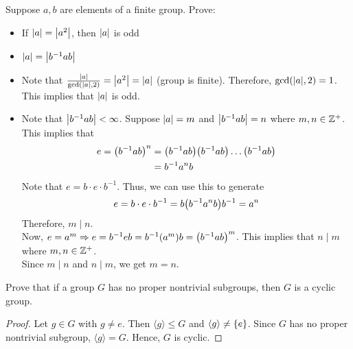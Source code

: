 \begin{exercise}
    Suppose $a, b$ are elements of a finite group. Prove:
    \begin{itemize}
        \item If $\qty|a| = \qty|a^2|$, then $\qty|a|$ is odd
        \item $\qty|a| = \qty|b^{-1}ab|$
    \end{itemize}
\end{exercise}

\begin{solution} \phantom{blank}
    \begin{itemize}
        \item Note that $\frac{\qty|a|}{\text{gcd}\qty(\qty|a|, 2)} = \qty|a^2| = \qty|a|$ (group is finite). Therefore, $\text{gcd}\qty(\qty|a|, 2) = 1$. This implies that $\qty|a|$ is odd.
        \item Note that $\qty|b^{-1}ab| < \infty$. Suppose $\qty|a| = m$ and $\qty|b^{-1}ab| = n$ where $m, n \in \mathbb{Z}^+$. This implies that
        \begin{align*}
            e = \qty(b^{-1}ab)^n &= \qty(b^{-1}ab)\qty(b^{-1}ab) \ldots \qty(b^{-1}ab) \\
            &= b^{-1}a^nb
        \end{align*}
        Note that $e = b \cdot e \cdot b^{-1}$. Thus, we can use this to generate
        \[ e = b \cdot e \cdot b^{-1} = b \qty(b^{-1} a^n b) b^{-1} = a^n \]
        Therefore, $m \mid n$. \\
        
        Now, $e = a^m \Rightarrow e = b^{-1}eb = b^{-1}\qty(a^m)b = \qty(b^{-1}ab)^m$. This implies that $n \mid m$ where $m, n \in \mathbb{Z}^+$. \\
        
        Since $m \mid n$ and $n \mid m$, we get $m = n$.
    \end{itemize}
\end{solution}

\begin{exercise}
    Prove that if a group $G$ has no proper nontrivial subgroups, then $G$ is a cyclic group.
\end{exercise}

\begin{proof}
    Let $g \in G$ with $g \neq e$. Then $\langle g \rangle \leq G$ and $\langle g \rangle \neq \qty{e}$. Since $G$ has no proper nontrivial subgroup, $\langle g \rangle = G$. Hence, $G$ is cyclic. \qedsymbol
\end{proof}


